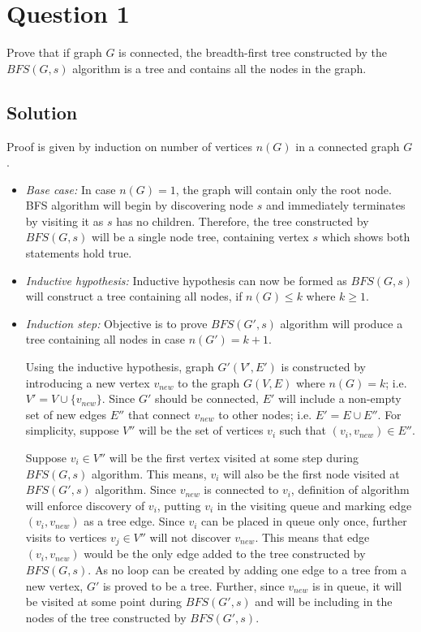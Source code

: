 
\section*{Question 1}

Prove that if graph $G$ is connected, the breadth-first tree constructed by the $BFS(G, s)$ algorithm is a tree and contains all the nodes in the graph.

\subsection*{Solution}

Proof is given by induction on number of vertices $n(G)$ in a connected graph $G$.
\begin{itemize}\itemsep=0pt
  \item[] \textit{Base case:} In case $n(G) = 1$, the graph will contain only the root node. BFS algorithm will begin by discovering node $s$ and immediately terminates by visiting it as $s$ has no children. Therefore, the tree constructed by $BFS(G,s)$ will be a single node tree, containing vertex $s$ which shows both statements hold true.
  \item[] \textit{Inductive hypothesis:} Inductive hypothesis can now be formed as $BFS(G,s)$ will construct a tree containing all nodes, if $n(G)\leq k$ where $k \geq 1$.
  \item[] \textit{Induction step:} Objective is to prove $BFS(G',s)$ algorithm will produce a tree containing all nodes in case $n(G')=k+1$.
  
  Using the inductive hypothesis, graph $G'(V',E')$ is constructed by introducing a new vertex $v_{new}$ to the graph $G(V,E)$ where $n(G) = k$; i.e. $V' = V \cup \{v_{new}\}$. Since $G'$ should be connected, $E'$ will include 
  a non-empty set of new edges $E''$ that connect $v_{new}$ to other nodes; i.e. $E' = E \cup E''$. For simplicity, suppose $V''$ will be the set of vertices $v_i$ such that $(v_i,v_{new})\in E''$.
  
  Suppose $v_i \in V''$ will be the first vertex visited at some step during $BFS(G,s)$ algorithm. This means, $v_i$ will also be the first node visited at $BFS(G',s)$ algorithm. Since $v_{new}$ is connected to $v_i$, definition of algorithm will enforce discovery of $v_i$, putting $v_i$ in the visiting queue and marking edge $(v_i,v_{new})$ as a tree edge. Since $v_i$ can be placed in queue only once, further visits to vertices $v_j \in V''$ will not discover $v_{new}$. This means that edge $(v_i,v_{new})$ would be the only edge added to the tree constructed by $BFS(G,s)$. As no loop can be created by adding one edge to a tree from a new vertex, $G'$ is proved to be a tree. Further, since $v_{new}$ is in queue, it will be visited at some point during $BFS(G',s)$ and will be including in the nodes of the tree constructed by $BFS(G',s)$.
\end{itemize}
